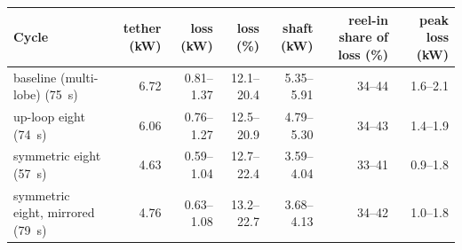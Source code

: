 \begin{tabular}{lrrrrrr}
\toprule
Cycle & tether (kW) & loss (kW) & loss (\%) & shaft (kW) & reel-in share of loss (\%) & peak loss (kW) \\
\midrule
baseline (multi-lobe) (75~s) & 6.72 & 0.81--1.37 & 12.1--20.4 & 5.35--5.91 & 34--44 & 1.6--2.1 \\
up-loop eight (74~s) & 6.06 & 0.76--1.27 & 12.5--20.9 & 4.79--5.30 & 34--43 & 1.4--1.9 \\
symmetric eight (57~s) & 4.63 & 0.59--1.04 & 12.7--22.4 & 3.59--4.04 & 33--41 & 0.9--1.8 \\
symmetric eight, mirrored (79~s) & 4.76 & 0.63--1.08 & 13.2--22.7 & 3.68--4.13 & 34--42 & 1.0--1.8 \\
\bottomrule
\end{tabular}
